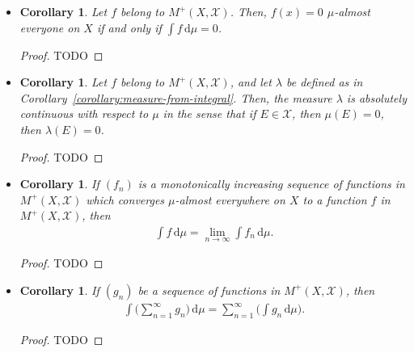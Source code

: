 \documentclass[10pt]{article}
\newtheorem{corollary}[lemma]{Corollary}
\newcommand{\dee}{\mathrm{d}}
\newcommand{\mcal}[1]{\mathcal{#1}}
\begin{document}
\begin{itemize}
  \begin{proof}
    TODO
  \end{proof}

  \item \begin{corollary}
    Let $f$ belong to $M^+(X, \mcal{X})$. Then, $f(x) = 0$ $\mu$-almost everyone on $X$ if and only if $\int f\, \dee\mu = 0$.
  \end{corollary}

  \begin{proof}
    TODO
  \end{proof}

  \item \begin{corollary}
    Let $f$ belong to $M^+(X, \mcal{X})$, and let $\lambda$ be defined as in Corollary~\ref{corollary:measure-from-integral}. Then, the measure $\lambda$ is absolutely continuous with respect to $\mu$ in the sense that if $E \in \mcal{X}$, then $\mu(E) = 0$, then $\lambda(E) = 0$.
  \end{corollary}

  \begin{proof}
    TODO
  \end{proof}

  \item \begin{corollary}
    If $(f_n)$ is a monotonically increasing sequence of functions in $M^+(X,\mcal{X})$ which converges $\mu$-almost everywhere on $X$ to a function $f$ in $M^+(X,\mcal{X})$, then
    \begin{align*}
      \int f\, \dee\mu = \lim_{n \rightarrow \infty} \int f_n\, \dee\mu.
    \end{align*}
  \end{corollary}

  \begin{proof}
    TODO
  \end{proof}

  \item \begin{corollary}
    If $(g_n)$ be a sequence of functions in $M^+(X,\mcal{X})$, then
    \begin{align*}
      \int \bigg( \sum_{n=1}^\infty g_n \bigg)\, \dee\mu = \sum_{n=1}^\infty \bigg( \int g_n\, \dee\mu \bigg).
    \end{align*}
  \end{corollary}

  \begin{proof}
    TODO
  \end{proof}
\end{itemize}
\end{document}
